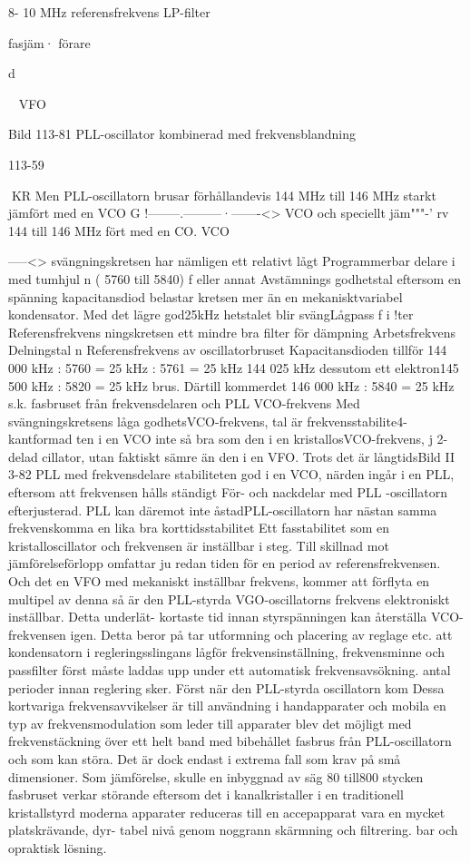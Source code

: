 {{{{8- 10 MHz
referensfrekvens
LP-filter

fasjäm·
förare

d

~
VFO

Bild 113-81 PLL-oscillator kombinerad med frekvensblandning

113-59

KR
Men PLL-oscillatorn
brusar
förhållandevis
144 MHz till 146 MHz
starkt jämfört med en
VCO G !--------.---------·-------<>
VCO och speciellt jäm"""-'
rv 144 till 146 MHz
fört
med en CO. VCO}-----<>
svängningskretsen har
nämligen ett relativt lågt
Programmerbar delare i med tumhjul
n ( 5760 till 5840)
f eller annat
Avstämnings
godhetstal eftersom en
spänning
kapacitansdiod belastar kretsen mer än en
mekanisktvariabel kondensator.
Med det lägre god25kHz
hetstalet blir svängLågpass f i !ter
Referensfrekvens
ningskretsen ett mindre
bra filter för dämpning
Arbetsfrekvens Delningstal n Referensfrekvens
av oscillatorbruset Kapacitansdioden tillför
144 000 kHz
: 5760
= 25 kHz
: 5761
= 25 kHz
144 025 kHz
dessutom ett elektron145 500 kHz
: 5820
= 25 kHz
brus. Därtill kommerdet
146 000 kHz
: 5840
= 25 kHz
s.k. fasbruset från frekvensdelaren och PLL
VCO-frekvens
Med svängningskretsens låga godhetsVCO-frekvens,
tal är frekvensstabilite4-kantformad
ten i en VCO inte så bra
som den i en kristallosVCO-frekvens,
j 2-delad
cillator, utan faktiskt
sämre än den i en VFO.
Trots det är långtidsBild II 3-82 PLL med frekvensdelare
stabiliteten god i en
VCO, närden ingår i en
PLL, eftersom att frekvensen hålls ständigt
För- och nackdelar med PLL -oscillatorn
efterjusterad. PLL kan däremot inte åstadPLL-oscillatorn har nästan samma frekvenskomma en lika bra korttidsstabilitet Ett fasstabilitet som en kristalloscillator och frekvensen är inställbar i steg. Till skillnad mot jämförelseförlopp omfattar ju redan tiden för
en period av referensfrekvensen. Och det
en VFO med mekaniskt inställbar frekvens,
kommer att förflyta en multipel av denna
så är den PLL-styrda VGO-oscillatorns frekvens elektroniskt inställbar. Detta underlät- kortaste tid innan styrspänningen kan återställa VCO-frekvensen igen. Detta beror på
tar utformning och placering av reglage etc.
att kondensatorn i regleringsslingans lågför frekvensinställning, frekvensminne och
passfilter först måste laddas upp under ett
automatisk frekvensavsökning.
antal perioder innan reglering sker.
Först när den PLL-styrda oscillatorn kom
Dessa kortvariga frekvensavvikelser är
till användning i handapparater och mobila
en typ av frekvensmodulation som leder till
apparater blev det möjligt med frekvenstäckning över ett helt band med bibehållet fasbrus från PLL-oscillatorn och som kan
störa. Det är dock endast i extrema fall som
krav på små dimensioner. Som jämförelse,
skulle en inbyggnad av säg 80 till800 stycken fasbruset verkar störande eftersom det i
kanalkristaller i en traditionell kristallstyrd
moderna apparater reduceras till en accepapparat vara en mycket platskrävande, dyr- tabel nivå genom noggrann skärmning och
filtrering.
bar och opraktisk lösning.

}}}
